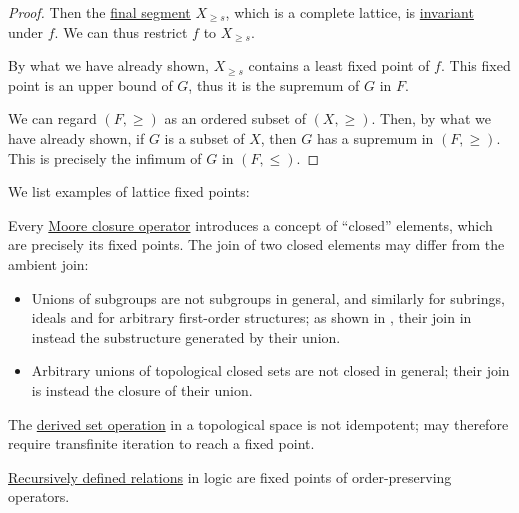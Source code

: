 \begin{proof}
  Then the \hyperref[def:order_interval/unbounded]{final segment} \( X_{\geq s} \), which is a complete lattice, is \hyperref[def:invariant_subset]{invariant} under \( f \). We can thus restrict \( f \) to \( X_{\geq s} \).

  By what we have already shown, \( X_{\geq s} \) contains a least fixed point of \( f \). This fixed point is an upper bound of \( G \), thus it is the supremum of \( G \) in \( F \).

   We can regard \( (F, \geq) \) as an ordered subset of \( (X, \geq) \). Then, by what we have already shown, if \( G \) is a subset of \( X \), then \( G \) has a supremum in \( (F, \geq) \). This is precisely the infimum of \( G \) in \( (F, \leq) \).
\end{proof}

\begin{example}\label{ex:thm:knaster_tarski}
  We list examples of lattice fixed points:
  \begin{thmenum}
     Every \hyperref[def:moore_closure_operator]{Moore closure operator} introduces a concept of \enquote{closed} elements, which are precisely its fixed points. The join of two closed elements may differ from the ambient join:
    \begin{itemize}
      \item Unions of subgroups are not subgroups in general, and similarly for subrings, ideals and for arbitrary first-order structures; as shown in , their join in instead the substructure generated by their union.
      \item Arbitrary unions of topological closed sets are not closed in general; their join is instead the closure of their union.
    \end{itemize}

     The \hyperref[def:derived_set]{derived set operation} in a topological space is not idempotent;  may therefore require transfinite iteration to reach a fixed point.

     \hyperref[thm:recursively_defined_relations]{Recursively defined relations} in logic are fixed points of order-preserving operators.
  \end{thmenum}
\end{example}

